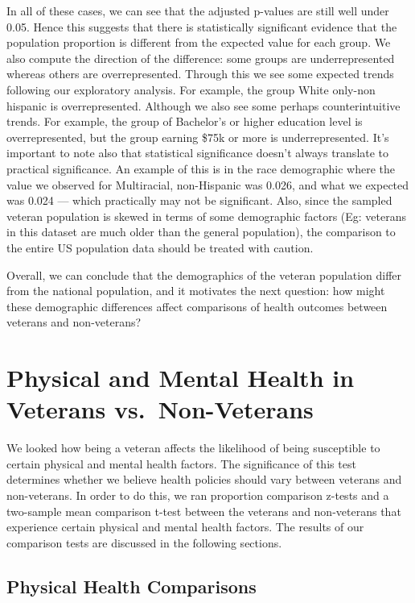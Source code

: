\documentclass[
  10pt,
  letterpaper,
  DIV=11,
  numbers=noendperiod]{scrartcl}
\begin{document}
In all of these cases, we can see that the adjusted p-values are still
well under 0.05. Hence this suggests that there is statistically
significant evidence that the population proportion is different from
the expected value for each group. We also compute the direction of the
difference: some groups are underrepresented whereas others are
overrepresented. Through this we see some expected trends following our
exploratory analysis. For example, the group White only-non hispanic is
overrepresented. Although we also see some perhaps counterintuitive
trends. For example, the group of Bachelor's or higher education level
is overrepresented, but the group earning \$75k or more is
underrepresented. It's important to note also that statistical
significance doesn't always translate to practical significance. An
example of this is in the race demographic where the value we observed
for Multiracial, non-Hispanic was 0.026, and what we expected was 0.024
--- which practically may not be significant. Also, since the sampled
veteran population is skewed in terms of some demographic factors (Eg:
veterans in this dataset are much older than the general population),
the comparison to the entire US population data should be treated with
caution.

Overall, we can conclude that the demographics of the veteran population
differ from the national population, and it motivates the next question:
how might these demographic differences affect comparisons of health
outcomes between veterans and non-veterans?

\section{Physical and Mental Health in Veterans
vs.~Non-Veterans}\label{physical-and-mental-health-in-veterans-vs.-non-veterans}

We looked how being a veteran affects the likelihood of being
susceptible to certain physical and mental health factors. The
significance of this test determines whether we believe health policies
should vary between veterans and non-veterans. In order to do this, we
ran proportion comparison z-tests and a two-sample mean comparison
t-test between the veterans and non-veterans that experience certain
physical and mental health factors. The results of our comparison tests
are discussed in the following sections.

\subsection{Physical Health
Comparisons}\label{physical-health-comparisons}
\end{document}
